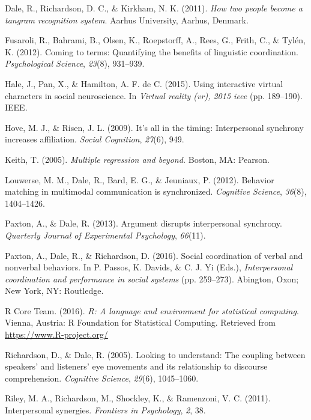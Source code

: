 \documentclass[10pt, letterpaper]{article}
\begin{document}
\hypertarget{ref-dale2011how}{}
Dale, R., Richardson, D. C., \& Kirkham, N. K. (2011). \emph{How two
people become a tangram recognition system}. Aarhus University, Aarhus,
Denmark.

\hypertarget{ref-fusaroli2012coming}{}
Fusaroli, R., Bahrami, B., Olsen, K., Roepstorff, A., Rees, G., Frith,
C., \& Tylén, K. (2012). Coming to terms: Quantifying the benefits of
linguistic coordination. \emph{Psychological Science}, \emph{23}(8),
931--939.

\hypertarget{ref-hale2015using}{}
Hale, J., Pan, X., \& Hamilton, A. F. de C. (2015). Using interactive
virtual characters in social neuroscience. In \emph{Virtual reality
(vr), 2015 ieee} (pp. 189--190). IEEE.

\hypertarget{ref-hove2009s}{}
Hove, M. J., \& Risen, J. L. (2009). It's all in the timing:
Interpersonal synchrony increases affiliation. \emph{Social Cognition},
\emph{27}(6), 949.

\hypertarget{ref-keith2005multiple}{}
Keith, T. (2005). \emph{Multiple regression and beyond.} Boston, MA:
Pearson.

\hypertarget{ref-louwerse2012behavior}{}
Louwerse, M. M., Dale, R., Bard, E. G., \& Jeuniaux, P. (2012). Behavior
matching in multimodal communication is synchronized. \emph{Cognitive
Science}, \emph{36}(8), 1404--1426.

\hypertarget{ref-paxton2013argument}{}
Paxton, A., \& Dale, R. (2013). Argument disrupts interpersonal
synchrony. \emph{Quarterly Journal of Experimental Psychology},
\emph{66}(11).

\hypertarget{ref-paxton2016social}{}
Paxton, A., Dale, R., \& Richardson, D. (2016). Social coordination of
verbal and nonverbal behaviors. In P. Passos, K. Davids, \& C. J. Yi
(Eds.), \emph{Interpersonal coordination and performance in social
systems} (pp. 259--273). Abington, Oxon; New York, NY: Routledge.

\hypertarget{ref-r2016r}{}
R Core Team. (2016). \emph{R: A language and environment for statistical
computing}. Vienna, Austria: R Foundation for Statistical Computing.
Retrieved from \url{https://www.R-project.org/}

\hypertarget{ref-richardson2005looking}{}
Richardson, D., \& Dale, R. (2005). Looking to understand: The coupling
between speakers' and listeners' eye movements and its relationship to
discourse comprehension. \emph{Cognitive Science}, \emph{29}(6),
1045--1060.

\hypertarget{ref-riley2011interpersonal}{}
Riley, M. A., Richardson, M., Shockley, K., \& Ramenzoni, V. C. (2011).
Interpersonal synergies. \emph{Frontiers in Psychology}, \emph{2}, 38.
\end{document}
